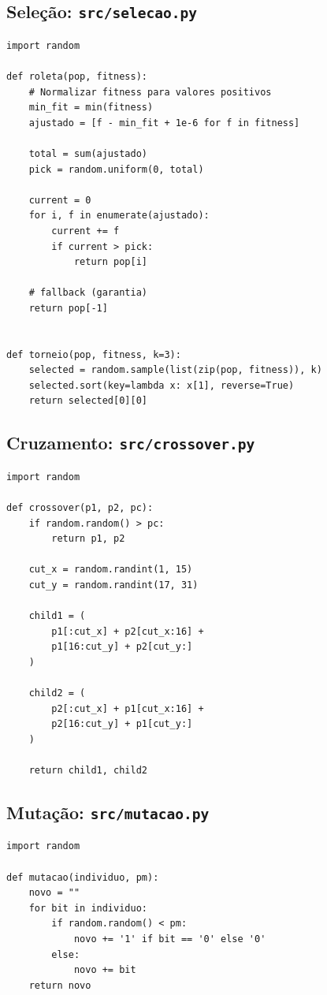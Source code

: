 \documentclass[a4paper,12pt]{article}
\begin{document}
\newpage
\subsection{Seleção: \texttt{src/selecao.py}}

\begin{lstlisting}[caption={src/selecao.py}]
import random

def roleta(pop, fitness):
    # Normalizar fitness para valores positivos
    min_fit = min(fitness)
    ajustado = [f - min_fit + 1e-6 for f in fitness]

    total = sum(ajustado)
    pick = random.uniform(0, total)

    current = 0
    for i, f in enumerate(ajustado):
        current += f
        if current > pick:
            return pop[i]

    # fallback (garantia)
    return pop[-1]


def torneio(pop, fitness, k=3):
    selected = random.sample(list(zip(pop, fitness)), k)
    selected.sort(key=lambda x: x[1], reverse=True)
    return selected[0][0]
\end{lstlisting}

\newpage
\subsection{Cruzamento: \texttt{src/crossover.py}}

\begin{lstlisting}[caption={src/crossover.py}]
import random

def crossover(p1, p2, pc):
    if random.random() > pc:
        return p1, p2

    cut_x = random.randint(1, 15)
    cut_y = random.randint(17, 31)

    child1 = (
        p1[:cut_x] + p2[cut_x:16] +
        p1[16:cut_y] + p2[cut_y:]
    )

    child2 = (
        p2[:cut_x] + p1[cut_x:16] +
        p2[16:cut_y] + p1[cut_y:]
    )

    return child1, child2
\end{lstlisting}

\subsection{Mutação: \texttt{src/mutacao.py}}

\begin{lstlisting}[caption={src/mutacao.py}]
import random

def mutacao(individuo, pm):
    novo = ""
    for bit in individuo:
        if random.random() < pm:
            novo += '1' if bit == '0' else '0'
        else:
            novo += bit
    return novo
\end{lstlisting}
\end{document}
